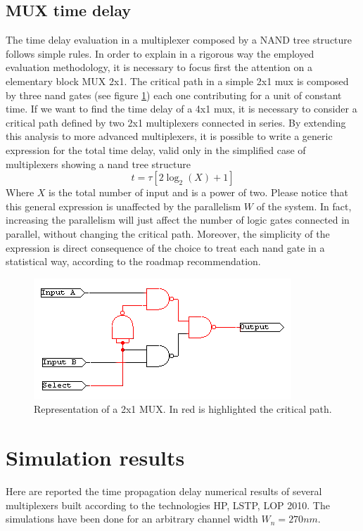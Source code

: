 \subsection{MUX time delay}
The time delay evaluation in a multiplexer composed by a NAND tree structure follows simple rules.  In order to explain in a rigorous way the employed evaluation methodology, it is necessary to focus first the attention on a elementary block MUX 2x1. The critical path in a simple 2x1 mux is composed by three nand gates (see figure \ref{fig:mux2x1}) each one contributing for a unit of constant time. If we want to find the time delay of a 4x1 mux, it is necessary to consider a critical path defined by two 2x1 multiplexers connected in series. By extending this analysis to more advanced multiplexers, it is possible to write a generic expression for the total time delay, valid only in the simplified case of  multiplexers showing a nand tree structure
\begin{equation}
t = \tau \left[ 2 \log_2 (X) +1\right] 
\end{equation}
Where $X$ is the total number of input and is a power of two. Please notice that this general expression is unaffected by the parallelism $W$ of the system. In fact, increasing the parallelism will just affect the number of logic gates connected in parallel, without changing the critical path. Moreover, the simplicity of the expression is direct consequence of the choice to treat each nand gate in a statistical way, according to the roadmap recommendation.

\begin{figure}[!]
	\centering
	\includegraphics[scale =1]{capitoli/2x1}
	\caption{Representation of a 2x1 MUX. In red is highlighted the critical path.}
	\label{fig:mux2x1}
\end{figure}

\section{Simulation results}
Here are reported the time propagation delay numerical results of several multiplexers built according to the technologies HP, LSTP, LOP 2010. The simulations have been done for an arbitrary channel width $W_n = 270nm$. \\\\

